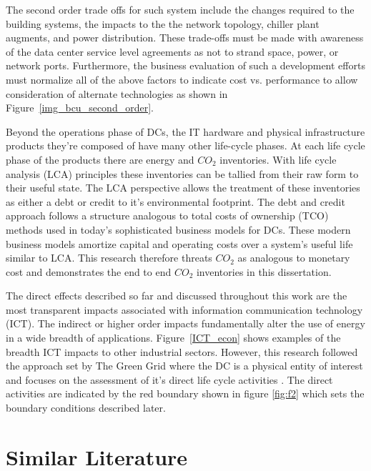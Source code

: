     The second order trade offs for such system include the changes required to the building systems, the impacts to the the network topology, chiller plant augments, and power distribution. These trade-offs must be made with awareness of the data center service level agreements as not to strand space, power, or network ports. Furthermore, the business evaluation of such a development efforts must normalize all of the above factors to indicate cost vs. performance to allow consideration of alternate technologies as shown in Figure~\ref{img_bcu_second_order}.
    
    
    
    Beyond the operations phase of DCs, the IT hardware and physical infrastructure products they're composed of have many other life-cycle phases. At each life cycle phase of the products there are energy and $CO_2$ inventories. With life cycle analysis (LCA) principles these inventories can be tallied from their raw form to their useful state.  The LCA perspective allows the treatment of these inventories as either a debt or credit to it's environmental footprint. The debt and credit approach follows a structure analogous to total costs of ownership (TCO) methods used in today's sophisticated business models for DCs. These modern business models amortize capital and operating costs over a system's useful life similar to LCA. This research therefore threats $CO_2$ as analogous to monetary cost and demonstrates the end to end $CO_2$ inventories in this dissertation.
    
    The direct effects described so far and discussed throughout this work are the most transparent impacts associated with information communication technology (ICT). The indirect or higher order impacts fundamentally alter the use of energy in a wide breadth of applications. Figure~\ref{ICT_econ} shows examples of the breadth ICT impacts to other industrial sectors. However, this research followed the approach set by The Green Grid where the DC is a physical entity of interest and focuses on the assessment of it's direct life cycle activities \cite{tgg12}. The direct activities are indicated by the red boundary shown in figure  \ref{fig:f2} which sets the boundary conditions described later. 
    
    
    
\section{Similar Literature}
    
